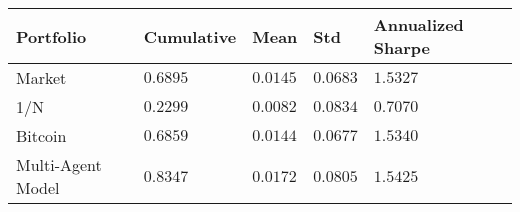 \begin{tabularx}{\linewidth}{*{5}{X}}
\toprule
Portfolio & Cumulative & Mean & Std & Annualized Sharpe \\
\midrule
Market & $0.6895$ & $0.0145$ & $0.0683$ & $1.5327$\\
1/N & $0.2299$ & $0.0082$ & $0.0834$ & $0.7070$\\
Bitcoin & $0.6859$ & $0.0144$ & $0.0677$ & $1.5340$\\
Multi-Agent Model & $0.8347$ & $0.0172$ & $0.0805$ & $1.5425$\\
\bottomrule
\end{tabularx}
